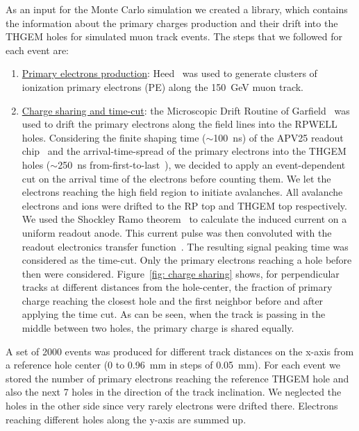 As an input for the Monte Carlo simulation we created a library, which contains the information about the primary charges production and their drift into the THGEM holes for simulated muon track events. 
The steps that we followed for each event are:

\begin{enumerate}
\item \underline{Primary electrons production}: Heed~\cite{smirnov2005modeling} was used to generate clusters of ionization primary electrons (PE) along the 150~GeV muon track. 
\item \underline{Charge sharing and time-cut}: the Microscopic Drift Routine of Garfield~\cite{veenhof2015garfield} was used to drift the primary electrons along the field lines into the RPWELL holes. Considering the finite shaping time ($\sim$100~ns) of the APV25 readout chip~\cite{french2001design} and the arrival-time-spread of the primary electrons into the THGEM holes ($\sim$250~ns from-first-to-last~\cite{peisert1984drift}),  we decided to apply an event-dependent cut on the arrival time of the electrons before counting them. 
We let the electrons reaching the high field region to initiate avalanches. All avalanche electrons and ions were drifted to the RP top and THGEM top respectively. We used the Shockley Ramo theorem~\cite{ramo1939currents,shockley1938currents} to calculate the induced current on a uniform readout anode. This current pulse was then convoluted with the readout electronics transfer function~\cite{french2001design}. The resulting signal peaking time was considered as the time-cut. Only the primary electrons reaching a hole before then were considered. Figure~\ref{fig: charge sharing} shows, for perpendicular tracks at different distances from the hole-center, the fraction of primary charge reaching the closest hole and the first neighbor before and after applying the time cut. As can be seen, when the track is passing in the middle between two holes, the primary charge is shared equally.
\end{enumerate}

A set of 2000 events was produced for different track distances on the x-axis from a reference hole center (0 to 0.96~mm in steps of 0.05~mm). For each event we stored the number of primary electrons reaching the reference THGEM hole and also the next 7 holes in the direction of the track inclination. We neglected the holes in the other side since very rarely electrons were drifted there. Electrons reaching different holes along the y-axis are summed up.

